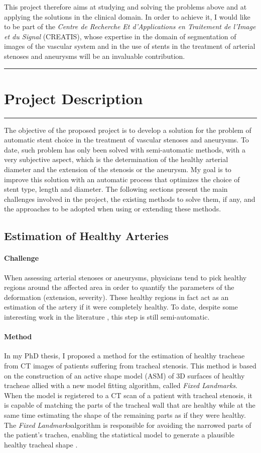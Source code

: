 \documentclass[a4paper]{article}
\newcommand{\fixedland}{{\it Fixed Landmarks}}
\newcommand{\challenge}{\paragraph{Challenge}}
\newcommand{\method}{\paragraph{Method}}
\begin{document}
This project therefore aims at studying and solving the problems above and at applying the solutions in the clinical domain. In order to achieve it, I would like to be part of the {\it Centre de Recherche Et d'Applications en Traitement de l'Image et du Signal} (CREATIS), whose expertise in the domain of segmentation of images of the vascular system and in the use of stents in the treatment of arterial stenoses and aneurysms will be an invaluable contribution.

\medskip
\medskip

\pagebreak

\hrule
\section{Project Description}
\hrule

\medskip
\medskip

The objective of the proposed project is to develop a solution for the problem of automatic stent choice in the treatment of vascular stenoses and aneurysms. To date, such problem has only been solved with semi-automatic methods, with a very subjective aspect, which is the determination of the healthy arterial diameter and the extension of the stenosis or the aneurysm. My goal is to improve this solution with an automatic process that optimizes the choice of stent type, length and diameter. The following sections present the main challenges involved in the project, the existing methods to solve them, if any, and the approaches to be adopted when using or extending these methods. 

\subsection{Estimation of Healthy Arteries}

\challenge
When assessing arterial stenoses or aneurysms, physicians tend to pick healthy regions around the affected area in order to quantify the parameters of the deformation (extension, severity). These healthy regions in fact act as an estimation of the artery if it were completely healthy. To date, despite some interesting work in the literature \citep{Bemmel,Scherl200721,Gremse01092011}, this step is still semi-automatic. 

\method
In my PhD thesis, I proposed a method for the estimation of healthy tracheae from CT images of patients suffering from tracheal stenosis. This method is based on the construction of an active shape model (ASM) \citep{Cootes} of 3D surfaces of healthy tracheae allied with a new model fitting algorithm, called \fixedland. When the model is registered to a CT scan of a patient with tracheal stenosis, it is capable of matching the parts of the tracheal wall that are healthy while at the same time estimating the shape of the remaining parts as if they were healthy. The \fixedland algorithm is responsible for avoiding the narrowed parts of the patient's trachea, enabling the statistical model to generate a plausible healthy tracheal shape \citep{Pinho:Trachea4}.
\end{document}
